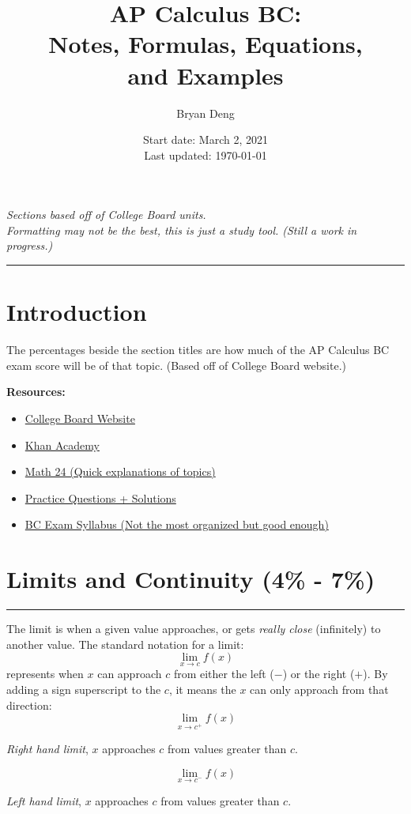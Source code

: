 \documentclass[12pt]{article}
\title{\textbf{AP Calculus BC:\\Notes, Formulas,  Equations,\\and Examples}}
\author{Bryan Deng}
\date{Start date: March 2, 2021\\Last updated: \today}
\newcommand{\fline}{\par\noindent\rule{\textwidth}{0.1pt}} %
\begin{document}
    \maketitle
    \vfill
    \begin{center}
        \textit{Sections based off of College Board units.\\
        Formatting may not be the best, this is just a study tool. (Still a work in progress.)}
    \end{center}
    \newpage

    \tableofcontents
    \fline
    \newpage

    \section*{Introduction}
        \indent The percentages beside the section titles are how much of the AP Calculus BC exam score will be of that topic. (Based off of College Board website.)

        \noindent \textbf{Resources:}
        \begin{itemize}
            \item \href{https://apstudents.collegeboard.org/courses/ap-calculus-bc}{College Board Website}
            \item \href{https://www.khanacademy.org/math/ap-calculus-bc}{Khan Academy}
            \item \href{https://www.math24.net/topics-calculus}{Math 24 (Quick explanations of topics)}
            \item \href{https://www.math.ucdavis.edu/~kouba/CalcOneDIRECTORY/}{Practice Questions + Solutions}
            \item \href{https://www.chelmsford.k12.ma.us/site/handlers/filedownload.ashx?moduleinstanceid=2496&dataid=7289&FileName=AP%20Calculus%20BC%20Syllabus.pdf}{BC Exam Syllabus (Not the most organized but good enough)}
        \end{itemize}

    \section{Limits and Continuity (4\% - 7\%)}
    \fline

        The limit is when a given value approaches, or gets \textit{really close} (infinitely) to another value. The standard notation for a limit:
        \[ \lim_{x \to c} f(x) \]
        represents when $x$ can approach $c$ from either the left ($-$) or the right ($+$). By adding a sign superscript to the $c$, it means the $x$ can only approach from that direction:
        \[ \lim_{x \to c^+} f(x) \]
        \begin{center}
            \textit{Right hand limit}, $x$ approaches $c$ from values greater than $c$.
        \end{center}
        \[ \lim_{x \to c^-} f(x) \]
        \begin{center}
            \textit{Left hand limit}, $x$ approaches $c$ from values greater than $c$.
        \end{center}
\end{document}
